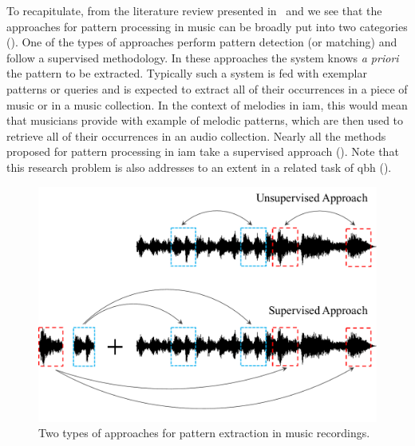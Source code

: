 
To recapitulate, from the literature review presented in~ and  we see that the approaches for pattern processing in music can be broadly put into two categories (). One of the types of approaches perform pattern detection (or matching) and follow a supervised methodology. In these approaches the system knows \textit{a priori} the pattern to be extracted. Typically such a system is fed with exemplar patterns or queries and is expected to extract all of their occurrences in a piece of music or in a music collection. In the context of melodies in \gls{iam}, this would mean that musicians provide with example of melodic patterns, which are then used to retrieve all of their occurrences in an audio collection. Nearly all the methods proposed for pattern processing in \gls{iam} take a supervised approach (). Note that this research problem is also addresses to an extent in a related task of \acrfull{qbh} ().

\begin{figure}
	\begin{center}
		\includegraphics[width=\figSizeEighty]{ch06_patterns/figures/discovery/TwoTypesOfMethodology.pdf}
	\end{center}
	\caption{Two types of approaches for pattern extraction in music recordings.}
	\label{fig:types_of_methodologies_for_extraction}
\end{figure}

